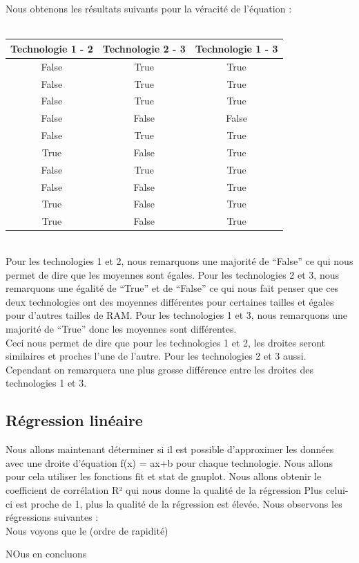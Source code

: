 \documentclass[a4paper,10pt]{article}
\begin{document}
\\
\\
Nous obtenons les résultats suivants pour la véracité de l'équation :\\
\\
\begin{tabular}{|c|c|c|}
\hline
Technologie 1 - 2 & Technologie 2 - 3 & Technologie 1 - 3 \\
\hline
False & True & True \\
\hline
False& True& True \\
\hline
False &True &True \\
\hline
False& False& False \\
\hline
False &True& True \\
\hline
True &False &True \\
\hline
False &True& True \\
\hline
False& False& True \\
\hline
True& False& True \\
\hline
True &False& True \\
\hline
\end{tabular}
\\
Pour les technologies 1 et 2, nous remarquons une majorité de ``False'' ce qui nous permet de dire que les moyennes sont égales. Pour les technologies 2 et 3,
nous remarquons une égalité de ``True'' et de ``False'' ce qui nous fait penser que ces deux technologies ont des moyennes différentes pour certaines tailles et 
égales pour d'autres tailles de RAM. Pour les technologies 1 et 3, nous remarquons une majorité de ``True'' donc les moyennes sont différentes.
\\
Ceci nous permet de dire que pour les technologies 1 et 2, les droites seront similaires et proches l'une de l'autre. Pour les technologies 2 et 3 aussi. Cependant
on remarquera une plus grosse différence entre les droites des technologies 1 et 3.
\subsection{Régression linéaire}
Nous allons maintenant déterminer si il est possible d'approximer les données avec une droite d'équation f(x) = ax+b pour chaque technologie.
Nous allons pour cela utiliser les fonctions fit et stat de gnuplot. Nous allons obtenir le coefficient de corrélation R² qui nous donne la qualité de la régression
Plus celui-ci est proche de 1, plus la qualité de la régression est élevée.
Nous observons les régressions suivantes : \\





Nous voyons que le (ordre de rapidité)

NOus en concluons
\end{document}
